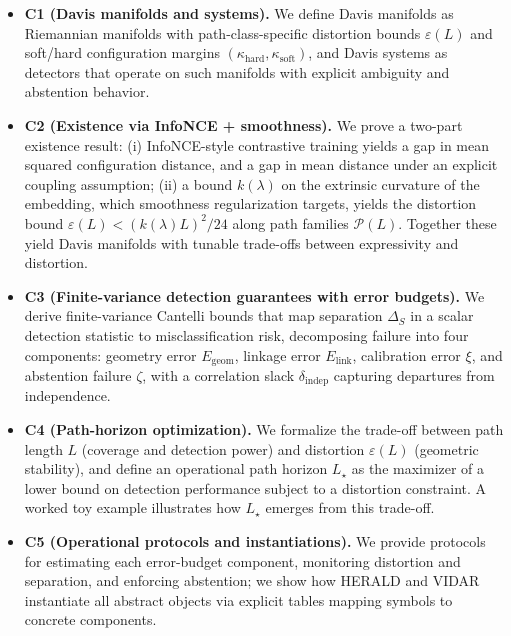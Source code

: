 \documentclass[11pt]{article}
\theoremstyle{remark}
\theoremstyle{plain}
\begin{document}
\begin{itemize}[leftmargin=*]
    \item \textbf{C1 (Davis manifolds and systems).} We define Davis manifolds as Riemannian manifolds with path-class-specific distortion bounds $\varepsilon(L)$ and soft/hard configuration margins $(\kappa_{\text{hard}}, \kappa_{\text{soft}})$, and Davis systems as detectors that operate on such manifolds with explicit ambiguity and abstention behavior.
    \item \textbf{C2 (Existence via InfoNCE + smoothness).} We prove a two-part existence result: (i) InfoNCE-style contrastive training yields a gap in mean squared configuration distance, and a gap in mean distance under an explicit coupling assumption; (ii) a bound $k(\lambda)$ on the extrinsic curvature of the embedding, which smoothness regularization targets, yields the distortion bound $\varepsilon(L) < (k(\lambda)L)^2/24$ along path families $\mathcal{P}(L)$. Together these yield Davis manifolds with tunable trade-offs between expressivity and distortion.
    \item \textbf{C3 (Finite-variance detection guarantees with error budgets).} We derive finite-variance Cantelli bounds that map separation $\Delta_S$ in a scalar detection statistic to misclassification risk, decomposing failure into four components: geometry error $E_{\text{geom}}$, linkage error $E_{\text{link}}$, calibration error $\xi$, and abstention failure $\zeta$, with a correlation slack $\delta_{\text{indep}}$ capturing departures from independence.
    \item \textbf{C4 (Path-horizon optimization).} We formalize the trade-off between path length $L$ (coverage and detection power) and distortion $\varepsilon(L)$ (geometric stability), and define an operational path horizon $L_\star$ as the maximizer of a lower bound on detection performance subject to a distortion constraint. A worked toy example illustrates how $L_\star$ emerges from this trade-off.
    \item \textbf{C5 (Operational protocols and instantiations).} We provide protocols for estimating each error-budget component, monitoring distortion and separation, and enforcing abstention; we show how HERALD and VIDAR instantiate all abstract objects via explicit tables mapping symbols to concrete components. 
\end{itemize}
\end{document}
